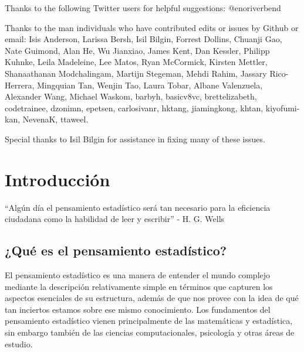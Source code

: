 \documentclass[
  12pt,
]{book}
\theoremstyle{definition}
\theoremstyle{definition}
\theoremstyle{definition}
\theoremstyle{remark}
\begin{document}
Thanks to the following Twitter users for helpful suggestions: @enoriverbend

Thanks to the man individuals who have contributed edits or issues by Github or email:
Isis Anderson, Larissa Bersh, Isil Bilgin, Forrest Dollins, Chuanji Gao, Nate Guimond, Alan He, Wu Jianxiao, James Kent, Dan Kessler, Philipp Kuhnke, Leila Madeleine, Lee Matos, Ryan McCormick, Kirsten Mettler, Shanaathanan Modchalingam, Martijn Stegeman, Mehdi Rahim, Jassary Rico-Herrera, Mingquian Tan, Wenjin Tao, Laura Tobar, Albane Valenzuela, Alexander Wang, Michael Waskom,
barbyh, basicv8vc, brettelizabeth, codetrainee, dzonimn, epetsen, carlosivanr, hktang, jiamingkong, khtan, kiyofumi-kan, NevenaK, ttaweel.

Special thanks to Isil Bilgin for assistance in fixing many of these issues.

\hypertarget{introducciuxf3n}{%
\chapter{Introducción}\label{introducciuxf3n}}

``Algún día el pensamiento estadístico será tan necesario para la eficiencia ciudadana como la habilidad de leer y escribir'' - H. G. Wells

\hypertarget{quuxe9-es-el-pensamiento-estaduxedstico}{%
\section{¿Qué es el pensamiento estadístico?}\label{quuxe9-es-el-pensamiento-estaduxedstico}}

El pensamiento estadístico es una manera de entender el mundo complejo mediante la descripción relativamente simple en términos que capturen los aspectos esenciales de su estructura, además de que nos provee con la idea de qué tan inciertos estamos sobre ese mismo conocimiento. Los fundamentos del pensamiento estadístico vienen principalmente de las matemáticas y estadística, sin embargo también de las ciencias computacionales, psicología y otras áreas de estudio.
\end{document}

